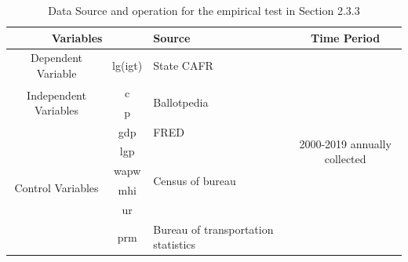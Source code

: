 \documentclass[man]{apa7}
\begin{document}
\begin{table}
  \centering
  \caption{Data Source and operation for the empirical test in Section 2.3.3}
  \begin{tabular}{ccp{8.785em}c}
    \toprule
    \multicolumn{2}{p{13.93em}}{Variables }                                         & Source  & \multicolumn{1}{p{7.785em}}{Time Period}                                                                         \\
    \midrule
    \multicolumn{1}{p{7em}}{Dependent Variable}                                     & lg(igt) & State CAFR                               & \multicolumn{1}{c}{\multirow{9}[18]{*}{2000-2019 annually collected}} \\
    \cmidrule{1-3}    \multicolumn{1}{c}{\multirow{2}[4]{*}{Independent Variables}} & c       & \multirow{2}[4]{*}{Ballotpedia}          &                                                                       \\
    \cmidrule{2-2}                                                                  & p       & \multicolumn{1}{c}{}                     &                                                                       \\
    \cmidrule{1-3}    \multicolumn{1}{c}{\multirow{6}[12]{*}{Control Variables}}    & gdp     & FRED                                     &                                                                       \\
    \cmidrule{2-3}                                                                  & lgp     & \multirow{4}[8]{*}{Census of bureau}     &                                                                       \\
    \cmidrule{2-2}                                                                  & wapw    & \multicolumn{1}{c}{}                     &                                                                       \\
    \cmidrule{2-2}                                                                  & mhi     & \multicolumn{1}{c}{}                     &                                                                       \\
    \cmidrule{2-2}                                                                  & ur      & \multicolumn{1}{c}{}                     &                                                                       \\
    \cmidrule{2-3}                                                                  & prm     & Bureau of transportation statistics      &                                                                       \\
    \bottomrule
  \end{tabular}%
  \label{Table A.1}%
\end{table}%
\end{document}
